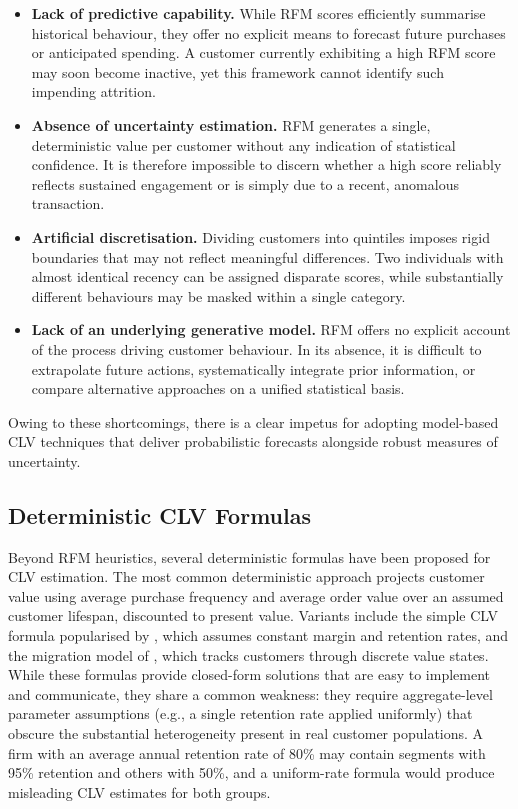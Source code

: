 \documentclass[12pt, a4paper, oneside]{report}
\begin{document}
\begin{itemize}
  \item \textbf{Lack of predictive capability.} While RFM scores efficiently summarise historical behaviour, they offer no explicit means to forecast future purchases or anticipated spending. A customer currently exhibiting a high RFM score may soon become inactive, yet this framework cannot identify such impending attrition.
  \item \textbf{Absence of uncertainty estimation.} RFM generates a single, deterministic value per customer without any indication of statistical confidence. It is therefore impossible to discern whether a high score reliably reflects sustained engagement or is simply due to a recent, anomalous transaction.
  \item \textbf{Artificial discretisation.} Dividing customers into quintiles imposes rigid boundaries that may not reflect meaningful differences. Two individuals with almost identical recency can be assigned disparate scores, while substantially different behaviours may be masked within a single category.
  \item \textbf{Lack of an underlying generative model.} RFM offers no explicit account of the process driving customer behaviour. In its absence, it is difficult to extrapolate future actions, systematically integrate prior information, or compare alternative approaches on a unified statistical basis.
\end{itemize}

Owing to these shortcomings, there is a clear impetus for adopting model-based CLV techniques that deliver probabilistic forecasts alongside robust measures of uncertainty.

\subsection{Deterministic CLV Formulas}
\label{sec:deterministic}

Beyond RFM heuristics, several deterministic formulas have been proposed for CLV estimation. The most common deterministic approach projects customer value using average purchase frequency and average order value over an assumed customer lifespan, discounted to present value. Variants include the simple CLV formula popularised by \textcite{gupta2003}, which assumes constant margin and retention rates, and the migration model of \textcite{dwyer1997}, which tracks customers through discrete value states. While these formulas provide closed-form solutions that are easy to implement and communicate, they share a common weakness: they require aggregate-level parameter assumptions (e.g., a single retention rate applied uniformly) that obscure the substantial heterogeneity present in real customer populations. A firm with an average annual retention rate of 80\% may contain segments with 95\% retention and others with 50\%, and a uniform-rate formula would produce misleading CLV estimates for both groups.
\end{document}
